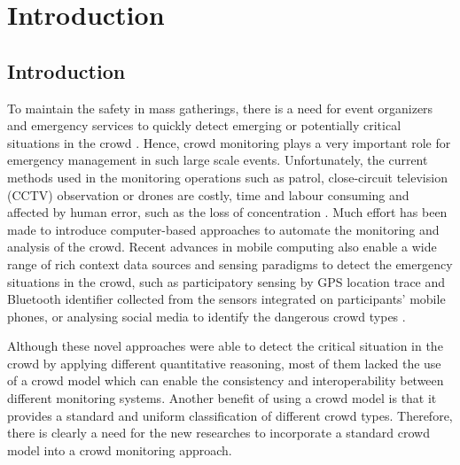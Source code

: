 \chapter{Introduction}  %
\label{ch:intro}
\ifpdf
    \graphicspath{{Chapter1/Figs/Raster/}{Chapter1/Figs/PDF/}{Chapter1/Figs/}}
\else
    \graphicspath{{Chapter1/Figs/Vector/}{Chapter1/Figs/}}
\fi

\section{Introduction}

To maintain the safety in mass gatherings, there is a need for event organizers and emergency services to quickly detect emerging or potentially critical situations in the crowd \citep{Wirz2012} . Hence, crowd monitoring plays a very important role for emergency management in such large scale events. Unfortunately, the current methods used in the monitoring operations such as patrol, close-circuit television (CCTV) observation or drones are costly, time and labour consuming and affected by human error, such as the loss of concentration \citep{Davies1995}. Much effort has been made to introduce computer-based approaches to automate the monitoring and analysis of the crowd. Recent advances in mobile computing also enable a wide range of rich context data sources and sensing paradigms to detect the emergency situations in the crowd, such as participatory sensing by GPS location trace \citep{Wirz2012} and Bluetooth identifier \citep{Weppner2013} collected from the sensors integrated on participants' mobile phones, or analysing social media to identify the dangerous crowd types \citep{DelirHaghighi2013}.

Although these novel approaches were able to detect the critical situation in the crowd by applying different quantitative reasoning, most of them lacked the use of a crowd model which can enable the consistency and interoperability between different monitoring systems. Another benefit of using a crowd model is that it provides a standard and uniform classification of different crowd types. Therefore, there is clearly a need for the new researches to incorporate a standard crowd model into a crowd monitoring approach.

